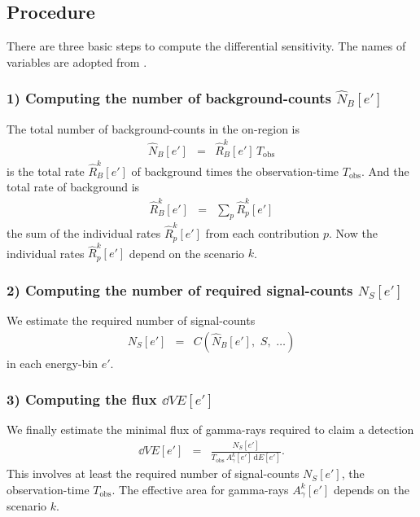 \documentclass{article}%
\begin{document}
        \subsection{Procedure}
            \label{SubSecProcedure}
            There are three basic steps to compute the differential sensitivity.
            The names of variables are adopted from \cite{li1983analysis}.
            \subsubsection*{1) Computing the number of background-counts $\hat{N}_B[e']$}
                The total number of background-counts in the on-region is
                \begin{eqnarray}
                    \hat{N}_B[e'] &=& \hat{R}^k_B[e'] \, T_\text{obs}
                \end{eqnarray}
                is the total rate $\hat{R}^k_B[e']$ of background times the observation-time $T_\text{obs}$.
                And the total rate of background is
                \begin{eqnarray}
                    \hat{R}^k_B[e'] &=& \sum_{p} \hat{R}^k_p[e']
                \end{eqnarray}
                the sum of the individual rates $\hat{R}^k_p[e']$ from each contribution $p$.
                Now the individual rates $\hat{R}^k_p[e']$ depend on the scenario $k$.
            \subsubsection*{2) Computing the number of required signal-counts $N_S[e']$}
                We estimate the required number of signal-counts
                \begin{eqnarray}
                    N_S[e'] &=& C(\hat{N}_B[e'],\,\,S,\,\,\dots)
                \end{eqnarray}
                in each energy-bin $e'$.
            \subsubsection*{3) Computing the flux $\dd{V}{E}[e']$}
                We finally estimate the minimal flux of gamma-rays required to claim a detection
                \begin{eqnarray}
                    \dd{V}{E}[e'] &=& \frac{N_S[e']}{{T_\text{obs}}\,{A^k_\gamma}[e']\,\text{d}E[e']}.
                \end{eqnarray}
                This involves at least the required number of signal-counts $N_S[e']$, the observation-time $T_\text{obs}$.
                The effective area for gamma-rays $A^k_\gamma[e']$ depends on the scenario $k$.
\end{document}
